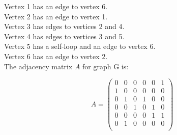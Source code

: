\documentclass{amsart}
\theoremstyle{definition}
\theoremstyle{Exercise}
\theoremstyle{remark}
\theoremstyle{rule}
\numberwithin{equation}{section}
\begin{document}
Vertex 1 has an edge to vertex 6.\\
Vertex 2 has an edge to vertex 1.\\
Vertex 3 has edges to vertices 2 and 4.\\
Vertex 4 has edges to vertices 3 and 5.\\
Vertex 5 has a self-loop and an edge to vertex 6.\\
Vertex 6 has an edge to vertex 2.\\

The adjacency matrix \( A \) for graph G is:

\[
A  = \begin{pmatrix}
0 & 0 & 0 & 0 & 0 & 1 \\
1 & 0 & 0 & 0 & 0 & 0 \\
0 & 1 & 0 & 1 & 0 & 0 \\
0 & 0 & 1 & 0 & 1 & 0 \\
0 & 0 & 0 & 0 & 1 & 1 \\
0 & 1 & 0 & 0 & 0 & 0 \\
\end{pmatrix}
\]
\\\\
\end{document}
